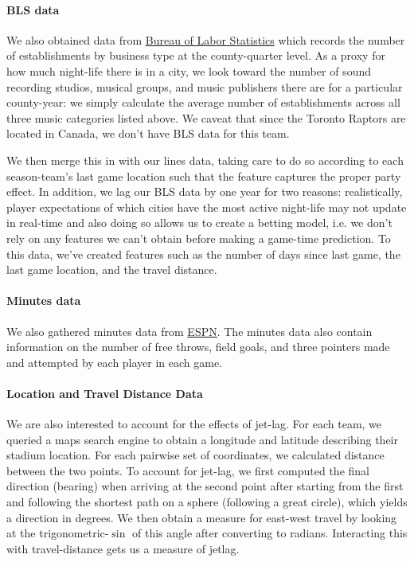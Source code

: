 \documentclass[letterpaper,12pt]{article}
\begin{document}
\paragraph{BLS data} We also obtained data from
\href{https://www.bls.gov/data/}{Bureau of Labor Statistics} which records the number of establishments by business type at the county-quarter level. As a 
proxy for how much night-life there is in a city, we look toward the 
number of sound recording studios, musical groups, and music publishers there 
are for a particular county-year: we simply calculate the average number of establishments across all three music categories listed above. We caveat that since the Toronto Raptors are located in Canada, we don't have BLS data for this team.

We then merge this in with our lines data, taking care to do so according to each season-team's last game location such that the feature captures the proper
party effect. In addition, we lag our BLS data by one year for two reasons:
realistically, player expectations of which cities have the most active night-life may not
update in real-time and also doing so allows us to create a betting model, i.e.
we don't rely on any features we can't obtain before making a game-time prediction. 
To this data, we've created features such as 
the number of days since last game, the last game location, and the travel distance. 

\paragraph{Minutes data}
We also gathered minutes data from \href{http://www.espn.com/nba/scoreboard/_/date/}{ESPN}.
The minutes data also contain information on the number of free throws, field goals, and three pointers made and attempted by each player in each game.

\paragraph{Location and Travel Distance Data} We are also interested
to account for the effects of jet-lag. For each team, we queried
a maps search engine to obtain a longitude and latitude describing their
stadium location.\cite{ggmap}
For each pairwise set of coordinates, we calculated distance between the two
points.\cite{sp} To account for jet-lag, we first computed the final direction 
(bearing) when arriving at the 
second point after starting from the first and following the shortest path on a sphere 
(following a great circle), which yields a direction in degrees. 
We then obtain a measure for east-west travel by looking at the trigonometric-$\sin$ of this angle after converting to radians.
Interacting this with travel-distance gets us a measure of jetlag.\cite{lallensack}
\end{document}
